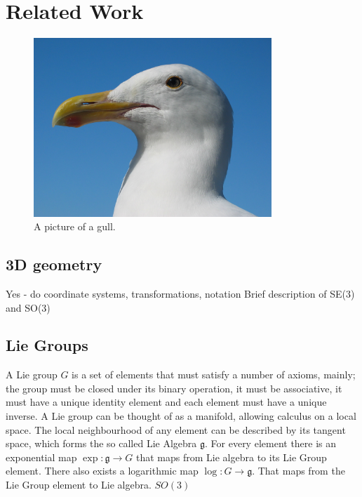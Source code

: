 
\chapter{Related Work}
\label{chapter:Related_Work}

\begin{figure}[h!]
  \centering
    \includegraphics[width=0.8\textwidth]{chapters/images/gull}
  \caption{A picture of a gull.}
\end{figure}

\section{3D geometry}

Yes  - do coordinate systems, transformations, notation
Brief description of SE(3) and SO(3)

\section{Lie Groups}
\label{sec:lie_group}

A Lie group $G$ is a set of elements that must satisfy a number of axioms, mainly; the group must be closed under its binary operation, it must be associative, it must have a unique identity element and each element must have a unique inverse.  A Lie group can be thought of as a manifold, allowing calculus on a local space.  The local neighbourhood of any element can be described by its tangent space, which forms the so called Lie Algebra $\mathfrak g$.  For every element there is an exponential map $\exp\colon \mathfrak g \to G$ that maps from Lie algebra to its Lie Group element.  There also exists a logarithmic map $\log\colon G \to \mathfrak g$.  That maps from the Lie Group element to Lie algebra.
$SO(3)$

